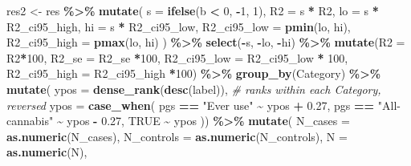 \documentclass[
]{article}
\newenvironment{Shaded}{\begin{snugshade}}{\end{snugshade}}
\newcommand{\AttributeTok}[1]{\textcolor[rgb]{0.13,0.29,0.53}{#1}}
\newcommand{\CommentTok}[1]{\textcolor[rgb]{0.56,0.35,0.01}{\textit{#1}}}
\newcommand{\ConstantTok}[1]{\textcolor[rgb]{0.56,0.35,0.01}{#1}}
\newcommand{\DecValTok}[1]{\textcolor[rgb]{0.00,0.00,0.81}{#1}}
\newcommand{\FloatTok}[1]{\textcolor[rgb]{0.00,0.00,0.81}{#1}}
\newcommand{\FunctionTok}[1]{\textcolor[rgb]{0.13,0.29,0.53}{\textbf{#1}}}
\newcommand{\NormalTok}[1]{#1}
\newcommand{\OtherTok}[1]{\textcolor[rgb]{0.56,0.35,0.01}{#1}}
\newcommand{\SpecialCharTok}[1]{\textcolor[rgb]{0.81,0.36,0.00}{\textbf{#1}}}
\newcommand{\StringTok}[1]{\textcolor[rgb]{0.31,0.60,0.02}{#1}}
\begin{document}
\begin{Shaded}
\begin{Highlighting}[]
\NormalTok{res2 }\OtherTok{\textless{}{-}}\NormalTok{ res }\SpecialCharTok{\%\textgreater{}\%}
  \FunctionTok{mutate}\NormalTok{(}
      \AttributeTok{s =} \FunctionTok{ifelse}\NormalTok{(b }\SpecialCharTok{\textless{}} \DecValTok{0}\NormalTok{, }\SpecialCharTok{{-}}\DecValTok{1}\NormalTok{, }\DecValTok{1}\NormalTok{),}
      \AttributeTok{R2 =}\NormalTok{ s }\SpecialCharTok{*}\NormalTok{ R2,}
      \AttributeTok{lo =}\NormalTok{ s }\SpecialCharTok{*}\NormalTok{ R2\_ci95\_high,}
      \AttributeTok{hi =}\NormalTok{ s }\SpecialCharTok{*}\NormalTok{ R2\_ci95\_low,}
      \AttributeTok{R2\_ci95\_low  =} \FunctionTok{pmin}\NormalTok{(lo, hi),}
      \AttributeTok{R2\_ci95\_high =} \FunctionTok{pmax}\NormalTok{(lo, hi)}
\NormalTok{    ) }\SpecialCharTok{\%\textgreater{}\%}
  \FunctionTok{select}\NormalTok{(}\SpecialCharTok{{-}}\NormalTok{s, }\SpecialCharTok{{-}}\NormalTok{lo, }\SpecialCharTok{{-}}\NormalTok{hi) }\SpecialCharTok{\%\textgreater{}\%} 
  \FunctionTok{mutate}\NormalTok{(}\AttributeTok{R2 =}\NormalTok{ R2}\SpecialCharTok{*}\DecValTok{100}\NormalTok{, }\AttributeTok{R2\_se =}\NormalTok{ R2\_se }\SpecialCharTok{*}\DecValTok{100}\NormalTok{,}
         \AttributeTok{R2\_ci95\_low =}\NormalTok{ R2\_ci95\_low }\SpecialCharTok{*} \DecValTok{100}\NormalTok{, }
         \AttributeTok{R2\_ci95\_high =}\NormalTok{ R2\_ci95\_high }\SpecialCharTok{*}\DecValTok{100}\NormalTok{) }\SpecialCharTok{\%\textgreater{}\%} 
  \FunctionTok{group\_by}\NormalTok{(Category) }\SpecialCharTok{\%\textgreater{}\%}
  \FunctionTok{mutate}\NormalTok{(}
    \AttributeTok{ypos =} \FunctionTok{dense\_rank}\NormalTok{(}\FunctionTok{desc}\NormalTok{(label)),   }\CommentTok{\# ranks within each Category, reversed}
    \AttributeTok{ypos =} \FunctionTok{case\_when}\NormalTok{(}
\NormalTok{      pgs }\SpecialCharTok{==} \StringTok{"Ever use"}     \SpecialCharTok{\textasciitilde{}}\NormalTok{ ypos }\SpecialCharTok{+} \FloatTok{0.27}\NormalTok{,}
\NormalTok{      pgs }\SpecialCharTok{==} \StringTok{"All{-}cannabis"} \SpecialCharTok{\textasciitilde{}}\NormalTok{ ypos }\SpecialCharTok{{-}} \FloatTok{0.27}\NormalTok{,}
      \ConstantTok{TRUE}                  \SpecialCharTok{\textasciitilde{}}\NormalTok{ ypos}
\NormalTok{    )) }\SpecialCharTok{\%\textgreater{}\%} 
  \FunctionTok{mutate}\NormalTok{(}
    \AttributeTok{N\_cases =} \FunctionTok{as.numeric}\NormalTok{(N\_cases),}
    \AttributeTok{N\_controls =} \FunctionTok{as.numeric}\NormalTok{(N\_controls),}
    \AttributeTok{N =} \FunctionTok{as.numeric}\NormalTok{(N),}

\end{Highlighting}
\end{Shaded}
\end{document}
